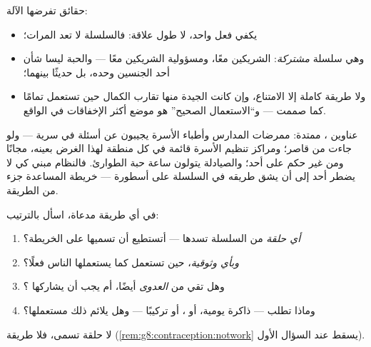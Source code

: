 \begin{proposition}\label{prop:g8:contraception:choice}
حقائق تفرضها الآلة:
\begin{itemize}
  \item يكفي  فعل واحد، لا طول علاقة: فالسلسلة لا
        تعد المرات؛
  \item وهي سلسلة \emph{مشتركة}:  الشريكين معًا،
        ومسؤولية الشريكين معًا ---  والحبة ليسا
        شأن أحد الجنسين وحده، بل حديثًا بينهما؛
  \item ولا طريقة كاملة إلا الامتناع، وإن كانت الجيدة
        منها تقارب الكمال حين تستعمل تمامًا كما صممت ---
        و``الاستعمال الصحيح'' هو موضع أكثر الإخفاقات في
        الواقع.
\end{itemize}
\end{proposition}
\admitted

\begin{example}\label{ex:g8:contraception:help}
عناوين ، ممتدة: ممرضات
المدارس وأطباء الأسرة يجيبون عن أسئلة  في سرية
--- ولو جاءت من قاصر؛ ومراكز تنظيم الأسرة قائمة في كل
منطقة لهذا الغرض بعينه، مجانًا ومن غير حكم على أحد؛
والصيادلة يتولون ساعة حبة الطوارئ. فالنظام مبني كي لا
يضطر أحد إلى أن يشق طريقه في السلسلة على أسطورة ---
خريطة المساعدة جزء من الطريقة.
\end{example}

\begin{method}\label{met:g8:contraception:evaluate}
في أي طريقة مدعاة، اسأل بالترتيب:
\begin{enumerate}
  \item \emph{أي حلقة} من السلسلة تسدها --- أتستطيع أن
        تسميها على الخريطة؟
  \item \emph{وبأي وثوقية}، حين تستعمل كما يستعملها
        الناس فعلًا؟
  \item وهل تقي من \emph{العدوى} أيضًا، أم يجب أن
        يشاركها ؟
  \item وماذا تطلب --- ذاكرة يومية، أو ، أو تركيبًا
        --- وهل يلائم ذلك مستعملها؟
\end{enumerate}
لا حلقة تسمى، فلا طريقة
(\cref{rem:g8:contraception:notwork} يسقط عند السؤال
الأول).
\end{method}

